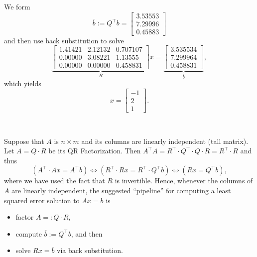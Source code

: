 We form
$$\overline{b}:= Q^\top b =  \left[ \begin{array}{r}
 3.53553\\
 7.29996\\
 0.45883
  \end{array} \right]
$$
and then use back substitution to solve
$$ \underbrace{\left[ \begin{array}{ccc} 
1.41421  &    2.12132    & 0.707107 \\
0.00000 & 3.08221    &   1.13555 \\
0.00000 &  0.00000 & 0.458831
  \end{array} \right]}_{R} x =  \underbrace{\left[ \begin{array}{r}
 3.535534\\
 7.299964\\
 0.458831
  \end{array} \right]}_{\overline{b}},$$
  which yields
  $$ x = \left[ \begin{array}{r}
 -1\\
 2\\
 1
  \end{array} \right]. $$

\Qed\\


\begin{tcolorbox}[sharp corners, colback=green!30, colframe=green!80!blue, title=\textbf{\Large Least Squares via the QR Factorization}]
Suppose that $A$ is $n \times m$ and its columns are linearly independent (tall matrix). Let $A=Q \cdot R$ be its QR Factorization. Then $A^\top A = R^\top \cdot Q^\top \cdot Q \cdot R = R^\top\cdot R$ and thus 
\begin{equation}
    \label{eq:SolvingAxbSquareQR}
    (A^\top \cdot Ax = A^\top b) \iff (R^\top \cdot R x = R^\top \cdot Q^\top b) \iff (R x = Q^\top b),
\end{equation}
where we have used the fact that $R$ is invertible. 
Hence, whenever the columns of $A$ are linearly independent, the suggested ``pipeline'' for  computing a least squared error solution to $Ax=b$ is 
\begin{itemize}
    \item factor $A =: Q \cdot R$,
    \item compute $\overline{b}:= Q^\top b$, and then 
    \item solve $R x = \overline{b}$ via back substitution.  
\end{itemize}
\end{tcolorbox}

